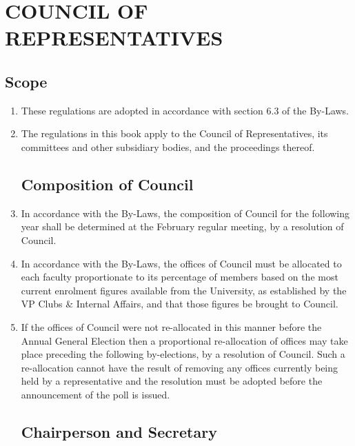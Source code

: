 \documentclass[oneside]{book}
\begin{document}
\part{\label{COUNCIL_OF_REPRESENTATIVES}COUNCIL OF REPRESENTATIVES}


\chapter{\label{Council_Scope}Scope }

\begin{enumerate}

\item These regulations are adopted in accordance with section 6.3 of the
By-Laws. 
\item The regulations in this book apply to the Council of Representatives,
its committees and other subsidiary bodies, and the proceedings thereof. 

\chapter{\label{Composition_of_Council}Composition of Council }
\item In accordance with the By-Laws, the composition of Council for the
following year shall be determined at the February regular meeting, by a resolution of Council. 
\item In accordance with the By-Laws, the offices of Council must be allocated
to each faculty proportionate to its percentage of members based on
the most current enrolment figures available from the University, as established by the VP Clubs 
\& Internal Affairs, and that those figures be brought to Council.
\item If the offices of Council were not re-allocated in this manner before the Annual General Election 
then a proportional re-allocation of offices may take place preceding the following by-elections, 
by a resolution of Council. Such a re-allocation cannot have the result of removing any offices 
currently being held by a representative and the resolution must be adopted before the announcement 
of the poll is issued.

\chapter{\label{Chairperson_and_Secretary}Chairperson and Secretary }



\end{enumerate}
\end{document}
